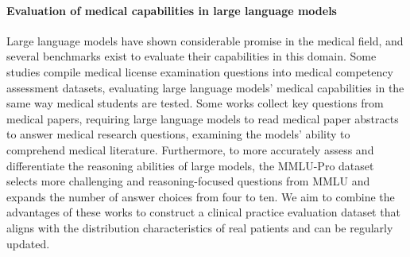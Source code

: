 \paragraph{Evaluation of medical capabilities in large language models} Large language models have shown considerable promise in the medical field, and several benchmarks exist to evaluate their capabilities in this domain. Some studies compile medical license examination questions into medical competency assessment datasets, evaluating large language models’ medical capabilities in the same way medical students are tested\cite{huang2025o1}. Some works collect key questions from medical papers, requiring large language models to read medical paper abstracts to answer medical research questions, examining the models’ ability to comprehend medical literature\cite{BenAbacha:MEDINFO19}. Furthermore, to more accurately assess and differentiate the reasoning abilities of large models, the MMLU-Pro\cite{wang2024mmlu} dataset selects more challenging and reasoning-focused questions from MMLU\cite{hendrycks2020measuring} and expands the number of answer choices from four to ten. We aim to combine the advantages of these works to construct a clinical practice evaluation dataset that aligns with the distribution characteristics of real patients and can be regularly updated.
